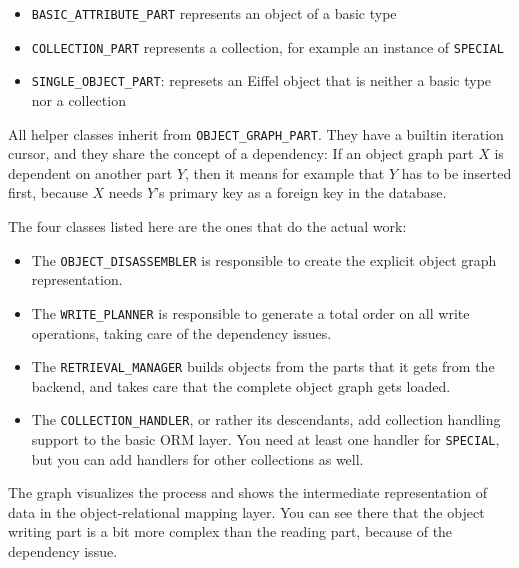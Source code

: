 \begin{itemize}
 \item \lstinline!BASIC_ATTRIBUTE_PART! represents an object of a basic type
 \item \lstinline!COLLECTION_PART! represents a collection, for example an instance of \lstinline!SPECIAL!
 \item \lstinline!SINGLE_OBJECT_PART!: represets an Eiffel object that is neither a basic type nor a collection
\end{itemize}

All helper classes inherit from \lstinline!OBJECT_GRAPH_PART!. 
They have a built\-in iteration cursor, and they share the concept of a dependency:
If an object graph part $X$ is dependent on another part $Y$, then it means for example that $Y$ has to be inserted first, because $X$ needs $Y$'s primary key as a foreign key in the database.

The four classes listed here are the ones that do the actual work:

\begin{itemize}
 \item The \lstinline!OBJECT_DISASSEMBLER! is responsible to create the explicit object graph representation.
 \item The \lstinline!WRITE_PLANNER! is responsible to generate a total order on all write operations, taking care of the dependency issues.
 \item The \lstinline!RETRIEVAL_MANAGER! builds objects from the parts that it gets from the backend, and takes care that the complete object graph gets loaded.
 \item The \lstinline!COLLECTION_HANDLER!, or rather its descendants, add collection handling support to the basic ORM layer. 
 You need at least one handler for \lstinline!SPECIAL!, but you can add handlers for other collections as well.
\end{itemize}

The graph visualizes the process and shows the intermediate representation of data in the object-relational mapping layer.
You can see there that the object writing part is a bit more complex than the reading part, because of the dependency issue.


